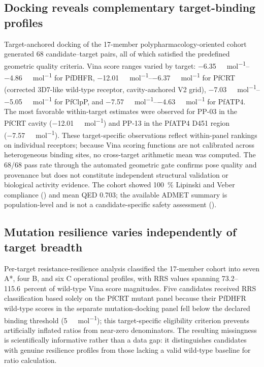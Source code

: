 \documentclass[journal=jcisd8,manuscript=article]{achemso}
\begin{document}
\subsection{Docking reveals complementary target-binding profiles}\label{sec:results_docking}
Target-anchored docking of the 17-member polypharmacology-oriented cohort generated \num{68} candidate--target pairs, all of which satisfied the predefined geometric quality criteria. Vina score ranges varied by target: \qtyrange{-6.35}{-4.86}{\kilo\calorie\per\mole} for PfDHFR, \qtyrange{-12.01}{-6.37}{\kilo\calorie\per\mole} for PfCRT (corrected 3D7-like wild-type receptor, cavity-anchored V2 grid), \qtyrange{-7.03}{-5.05}{\kilo\calorie\per\mole} for PfClpP, and \qtyrange{-7.57}{-4.63}{\kilo\calorie\per\mole} for PfATP4. The most favorable within-target estimates were observed for PP-03 in the PfCRT cavity (\num{-12.01}~\si{\kilo\calorie\per\mole}) and PP-13 in the PfATP4 D451 region (\num{-7.57}~\si{\kilo\calorie\per\mole}). These target-specific observations reflect within-panel rankings on individual receptors; because Vina scoring functions are not calibrated across heterogeneous binding sites, no cross-target arithmetic mean was computed. The \num{68}/\num{68} pass rate through the automated geometric gate confirms pose quality and provenance but does not constitute independent structural validation or biological activity evidence. The cohort showed \qty{100}{\percent} Lipinski and Veber compliance () and mean QED \num{0.703}; the available ADMET summary is population-level and is not a candidate-specific safety assessment ().

\subsection{Mutation resilience varies independently of target breadth}\label{sec:results_mutation}
Per-target resistance-resilience analysis classified the 17-member cohort into seven A*, four B, and six C operational profiles, with RRS values spanning \numrange{73.2}{115.6}~percent of wild-type Vina score magnitudes. Five candidates received RRS classification based solely on the PfCRT mutant panel because their PfDHFR wild-type scores in the separate mutation-docking panel fell below the declared binding threshold (\qty{5}{\kilo\calorie\per\mole}); this target-specific eligibility criterion prevents artificially inflated ratios from near-zero denominators. The resulting missingness is scientifically informative rather than a data gap: it distinguishes candidates with genuine resilience profiles from those lacking a valid wild-type baseline for ratio calculation.
\end{document}
